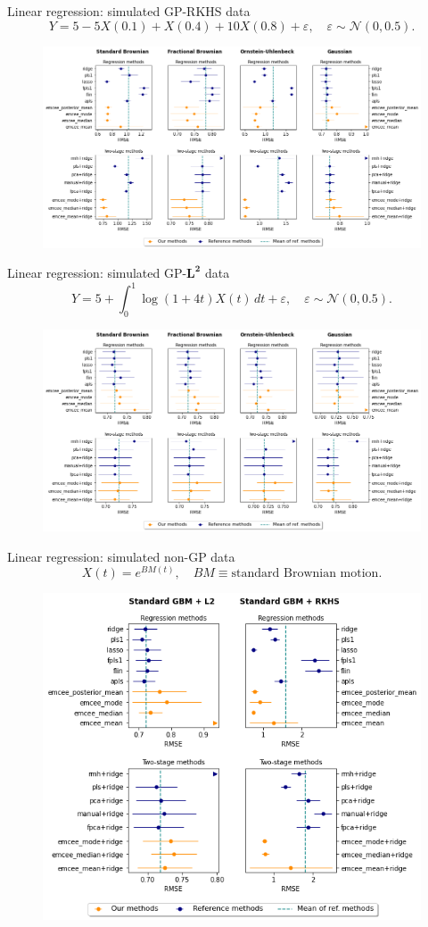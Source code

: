 \documentclass[9pt, english, professionalfonts]{beamer}
\renewcommand{\epsilon}{\varepsilon}
\begin{document}
\begin{frame}{Linear regression: simulated GP-RKHS data}
  \[
  Y=5 -5X(0.1) + X(0.4) + 10X(0.8) + \epsilon, \quad \epsilon \sim \mathcal N(0, 0.5).
  \]
  \begin{figure}
    \includegraphics[width=.95\textwidth]{reg_emcee_rkhs}
  \end{figure}
\end{frame}

\begin{frame}{Linear regression: simulated GP-\(\bm{L^2}\) data}
  \[
  Y = 5 + \int_0^1 \log(1+4t)X(t)\, dt + \epsilon, \quad \epsilon \sim \mathcal N(0, 0.5).
  \]
  \begin{figure}
    \includegraphics[width=.95\textwidth]{reg_emcee_l2}
  \end{figure}
\end{frame}

\begin{frame}{Linear regression: simulated non-GP data}
  \[
  X(t) = e^{BM(t)}, \quad BM \equiv \text{standard Brownian motion}.
  \]
  \begin{figure}
    \includegraphics[width=.6\textwidth]{reg_emcee_nongp}
  \end{figure}
\end{frame}
\end{document}
